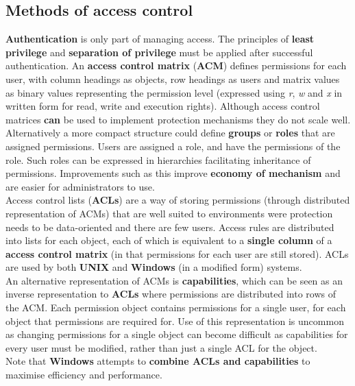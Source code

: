\documentclass[final]{article}
\newcommand{\np}{\vspace{8pt} \\}
\begin{document}
\subsection{Methods of access control}
\textbf{Authentication} is only part of managing access. The principles of \textbf{least privilege} and \textbf{separation of privilege} must be applied after successful authentication. An \textbf{access control matrix} (\textbf{ACM}) defines permissions for each user, with column headings as objects, row headings as users and matrix values as binary values representing the permission level (expressed using \textit{r}, \textit{w} and \textit{x} in written form for read, write and execution rights). Although access control matrices \textbf{can} be used to implement protection mechanisms they do not scale well. \np
Alternatively a more compact structure could define \textbf{groups} or \textbf{roles} that are assigned permissions. Users are assigned  a role, and have the permissions of the role. Such roles can be expressed in hierarchies facilitating inheritance of permissions. Improvements such as this improve \textbf{economy of mechanism} and are easier for administrators to use. \np
Access control lists (\textbf{ACLs}) are a way of storing permissions (through distributed representation of ACMs) that are well suited to environments were protection needs to be data-oriented and there are few users. Access rules are distributed into lists for each object, each of which is equivalent to a \textbf{single column} of a \textbf{access control matrix} (in that permissions for each user are still stored). ACLs are used by both \textbf{UNIX} and \textbf{Windows} (in a modified form) systems. \np
An alternative representation of ACMs is \textbf{capabilities}, which can be seen as an inverse representation to \textbf{ACLs} where permissions are distributed into rows of the ACM. Each permission object contains permissions for a single user, for each object that permissions are required for. Use of this representation is uncommon as changing permissions for a single object can become difficult as capabilities for every user must be modified, rather than just a single ACL for the object. \np
Note that \textbf{Windows} attempts to \textbf{combine ACLs and capabilities} to maximise efficiency and performance.
\end{document}
